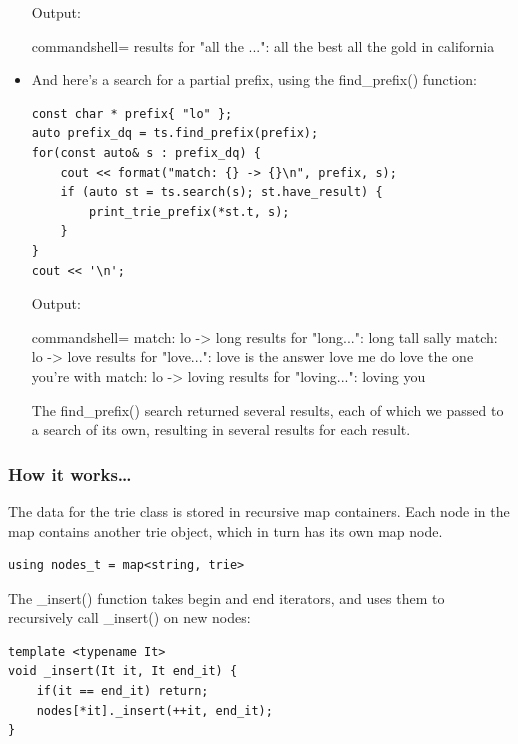 \begin{itemize}
Output:

\begin{tcblisting}{commandshell={}}
results for "all the ...":
all the best
all the gold in california
\end{tcblisting}

\item
And here's a search for a partial prefix, using the find\_prefix() function:

\begin{lstlisting}[style=styleCXX]
const char * prefix{ "lo" };
auto prefix_dq = ts.find_prefix(prefix);
for(const auto& s : prefix_dq) {
	cout << format("match: {} -> {}\n", prefix, s);
	if (auto st = ts.search(s); st.have_result) {
		print_trie_prefix(*st.t, s);
	}
}
cout << '\n';
\end{lstlisting}

Output:

\begin{tcblisting}{commandshell={}}
match: lo -> long
results for "long...":
long tall sally
match: lo -> love
results for "love...":
love is the answer
love me do
love the one you're with
match: lo -> loving
results for "loving...":
loving you
\end{tcblisting}

The find\_prefix() search returned several results, each of which we passed to a search of its own, resulting in several results for each result.

\end{itemize}

\subsubsection{How it works…}

The data for the trie class is stored in recursive map containers. Each node in the map contains another trie object, which in turn has its own map node.

\begin{lstlisting}[style=styleCXX]
using nodes_t = map<string, trie>
\end{lstlisting}

The \_insert() function takes begin and end iterators, and uses them to recursively call \_insert() on new nodes:

\begin{lstlisting}[style=styleCXX]
template <typename It>
void _insert(It it, It end_it) {
	if(it == end_it) return;
	nodes[*it]._insert(++it, end_it);
}
\end{lstlisting}

